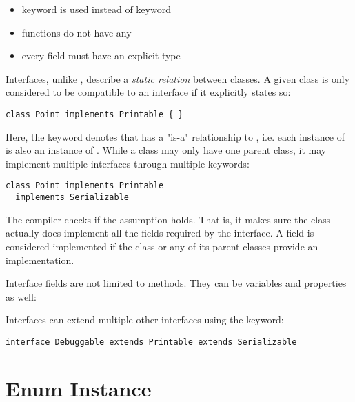 \begin{itemize}
	\item {} keyword is used instead of  keyword
	\item functions do not have any 
	\item every field must have an explicit type
\end{itemize}
Interfaces, unlike , describe a \emph{static relation} between classes. A given class is only considered to be compatible to an interface if it explicitly states so:

\begin{lstlisting}
class Point implements Printable { }
\end{lstlisting}
Here, the  keyword denotes that  has a "is-a" relationship to , i.e. each instance of  is also an instance of . While a class may only have one parent class, it may implement multiple interfaces through multiple  keywords:

\begin{lstlisting}
class Point implements Printable
  implements Serializable
\end{lstlisting}

The compiler checks if the  assumption holds. That is, it makes sure the class actually does implement all the fields required by the interface. A field is considered implemented if the class or any of its parent classes provide an implementation.

Interface fields are not limited to methods. They can be variables and properties as well:


Interfaces can extend multiple other interfaces using the  keyword:
\begin{lstlisting}
interface Debuggable extends Printable extends Serializable
\end{lstlisting}




\section{Enum Instance}
\label{types-enum-instance}

